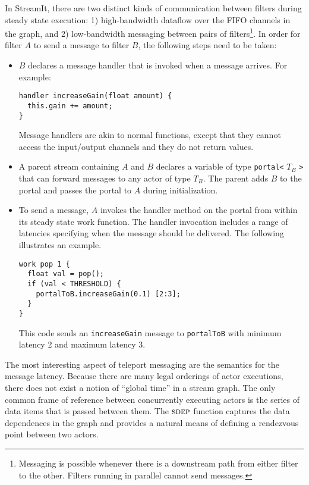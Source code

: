 In StreamIt, there are two distinct kinds of communication between
filters during steady state execution: 1) high-bandwidth dataflow over
the FIFO channels in the graph, and 2) low-bandwidth messaging between
pairs of filters\footnote{\small Messaging is possible whenever there
is a downstream path from either filter to the other.  Filters running
in parallel cannot send messages.}.  In order for filter $A$ to send a
message to filter $B$, the following steps need to be taken:
\begin{itemize}

\item $B$ declares a message handler that is invoked when a
message arrives.  For example:
{\small
\begin{verbatim}
handler increaseGain(float amount) {
  this.gain += amount;
}
\end{verbatim}
}
Message handlers are akin to normal functions, except that they
cannot access the input/output channels and they do not return values.

\item A parent stream containing $A$ and $B$ declares a variable
of type {\tt portal<} $T_B$ {\tt >} that can forward messages to
any actor of type $T_B$.  The parent adds $B$ to the portal and passes
the portal to $A$ during initialization.

\item To send a message, $A$ invokes the handler method on the portal
from within its steady state work function. The handler invocation
includes a range of latencies specifying when the message should be
delivered. The following illustrates an example.\\
{\small
\begin{verbatim}
work pop 1 {
  float val = pop();
  if (val < THRESHOLD) {
    portalToB.increaseGain(0.1) [2:3];
  }
}
\end{verbatim}}
This code sends an {\tt increaseGain} message to {\tt portalToB} with
minimum latency 2 and maximum latency 3.

\end{itemize}
The most interesting aspect of teleport messaging are the semantics
for the message latency.  Because there are many legal orderings of
actor executions, there does not exist a notion of ``global time'' in
a stream graph.  The only common frame of reference between
concurrently executing actors is the series of data items that is
passed between them.  The $\textsc{sdep}$ function captures the data
dependences in the graph and provides a natural means of defining a
rendezvous point between two actors.

